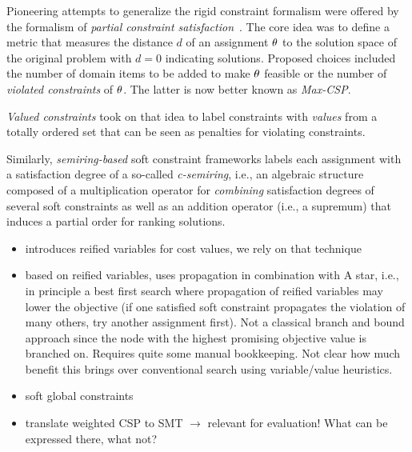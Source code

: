 Pioneering attempts to generalize the rigid constraint formalism
were offered by the formalism of \emph{partial constraint 
satisfaction}~\cite{FreuderW92}. The core idea was to define
a metric that measures the distance $d$ of an assignment $\theta$
to the solution space of the original problem
with $d=0$ indicating solutions. Proposed
choices included the number of domain items to be added to make 
$\theta$ feasible or the number of \emph{violated constraints} of 
$\theta$. The latter is now better known as \emph{Max-CSP}.

\emph{Valued constraints} took on that idea to label constraints
with \emph{values} from a totally ordered set that can be seen as 
penalties for violating constraints.

Similarly, \emph{semiring-based} soft constraint frameworks
labels each assignment with a satisfaction degree of a so-called 
\emph{c-semiring}, i.e., an algebraic structure composed of a 
multiplication operator for \emph{combining} satisfaction degrees of 
several soft constraints as well as an addition operator (i.e., a supremum) that induces a partial order for ranking solutions.

\begin{itemize}
\item {} \cite{petit2000meta} introduces reified variables for cost values, we rely
on that technique
\item {} \cite{sachenbacher2006conflict} based on reified variables, uses propagation in combination with A star, i.e., in principle a best first search where propagation of reified variables may lower the objective (if one satisfied soft constraint propagates the violation of many others, try another assignment first). Not a classical branch and bound approach since
the node with the highest promising objective value is branched on. Requires quite some manual bookkeeping. Not clear how much benefit this brings over conventional search using variable/value heuristics.  
\item \cite{van2011over} soft global constraints
\item \cite{AnsoteguiBPSV13constraints} translate weighted CSP to SMT $\rightarrow$ relevant for evaluation! What can be expressed there, what not?
\end{itemize}
